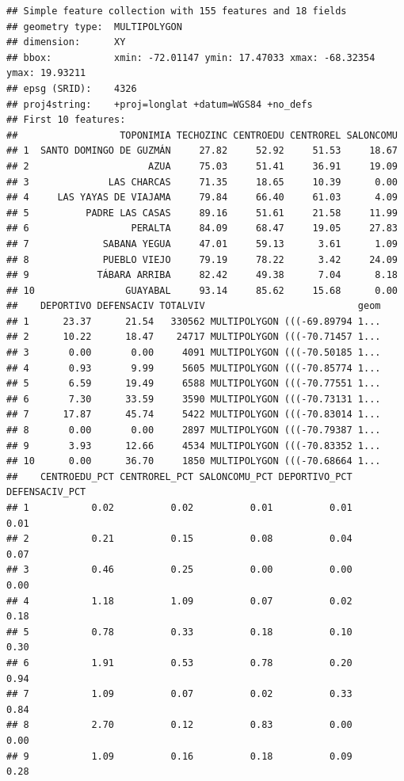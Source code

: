 \documentclass[11pt,]{article}
\begin{document}
\begin{verbatim}
## Simple feature collection with 155 features and 18 fields
## geometry type:  MULTIPOLYGON
## dimension:      XY
## bbox:           xmin: -72.01147 ymin: 17.47033 xmax: -68.32354 ymax: 19.93211
## epsg (SRID):    4326
## proj4string:    +proj=longlat +datum=WGS84 +no_defs
## First 10 features:
##                  TOPONIMIA TECHOZINC CENTROEDU CENTROREL SALONCOMU
## 1  SANTO DOMINGO DE GUZMÁN     27.82     52.92     51.53     18.67
## 2                     AZUA     75.03     51.41     36.91     19.09
## 3              LAS CHARCAS     71.35     18.65     10.39      0.00
## 4     LAS YAYAS DE VIAJAMA     79.84     66.40     61.03      4.09
## 5          PADRE LAS CASAS     89.16     51.61     21.58     11.99
## 6                  PERALTA     84.09     68.47     19.05     27.83
## 7             SABANA YEGUA     47.01     59.13      3.61      1.09
## 8             PUEBLO VIEJO     79.19     78.22      3.42     24.09
## 9            TÁBARA ARRIBA     82.42     49.38      7.04      8.18
## 10                GUAYABAL     93.14     85.62     15.68      0.00
##    DEPORTIVO DEFENSACIV TOTALVIV                           geom
## 1      23.37      21.54   330562 MULTIPOLYGON (((-69.89794 1...
## 2      10.22      18.47    24717 MULTIPOLYGON (((-70.71457 1...
## 3       0.00       0.00     4091 MULTIPOLYGON (((-70.50185 1...
## 4       0.93       9.99     5605 MULTIPOLYGON (((-70.85774 1...
## 5       6.59      19.49     6588 MULTIPOLYGON (((-70.77551 1...
## 6       7.30      33.59     3590 MULTIPOLYGON (((-70.73131 1...
## 7      17.87      45.74     5422 MULTIPOLYGON (((-70.83014 1...
## 8       0.00       0.00     2897 MULTIPOLYGON (((-70.79387 1...
## 9       3.93      12.66     4534 MULTIPOLYGON (((-70.83352 1...
## 10      0.00      36.70     1850 MULTIPOLYGON (((-70.68664 1...
##    CENTROEDU_PCT CENTROREL_PCT SALONCOMU_PCT DEPORTIVO_PCT DEFENSACIV_PCT
## 1           0.02          0.02          0.01          0.01           0.01
## 2           0.21          0.15          0.08          0.04           0.07
## 3           0.46          0.25          0.00          0.00           0.00
## 4           1.18          1.09          0.07          0.02           0.18
## 5           0.78          0.33          0.18          0.10           0.30
## 6           1.91          0.53          0.78          0.20           0.94
## 7           1.09          0.07          0.02          0.33           0.84
## 8           2.70          0.12          0.83          0.00           0.00
## 9           1.09          0.16          0.18          0.09           0.28

\end{verbatim}
\end{document}
